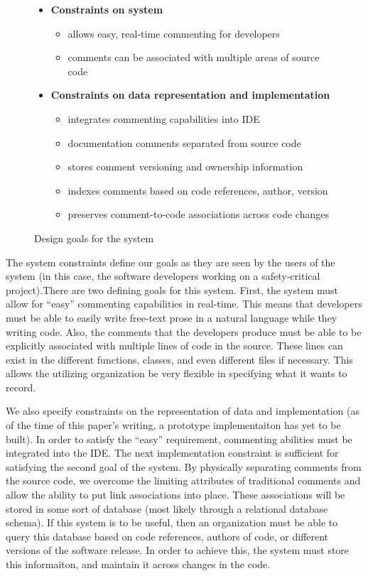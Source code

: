\begin{figure}
\makebox[\textwidth]{\hrulefill}
\begin{itemize}
  \item \textbf{Constraints on system}
    \begin{itemize}
      \item allows easy, real-time commenting for developers
      \item comments can be associated with multiple areas of source code
    \end{itemize}
  \item \textbf{Constraints on data representation and implementation}
    \begin{itemize}
      \item integrates commenting capabilities into IDE
      \item documentation comments separated from source code
      \item stores comment versioning and ownership information
      \item indexes comments based on code references, author, version
      \item preserves comment-to-code associations across code changes
    \end{itemize}
\end{itemize}
\makebox[\textwidth]{\hrulefill}
\caption{Design goals for the system}
\label{fig:design_criteria}
\end{figure}

The system constraints define our goals as they are seen by the users of the
system (in this case, the software developers working on a safety-critical
project).There are two defining goals for this system. First, the system must
allow for ``easy'' commenting capabilities in real-time. This means that
developers must be able to easily write free-text prose in a natural language
while they writing code. Also, the comments that the developers produce must be
able to be explicitly associated with multiple lines of code in the source.
These lines can exist in the different functions, classes, and even different
files if necessary. This allows the utilizing organization be very flexible in
specifying what it wants to record.

We also specify constraints on the representation of data and implementation (as
of the time of this paper's writing, a prototype implementaiton has yet to be
built). In order to satisfy the ``easy'' requirement, commenting abilities must
be integrated into the IDE. The next implementation constraint is sufficient for
satisfying the second goal of the system. By physically separating comments from
the source code, we overcome the limiting attributes of traditional comments and
allow the ability to put link associations into place. These associations will
be stored in some sort of database (most likely through a relational database
schema). If this system is to be useful, then an organization must be able to
query this database based on code references, authors of code, or different
versions of the software release. In order to achieve this, the system must
store this informaiton, and maintain it across changes in the code.

